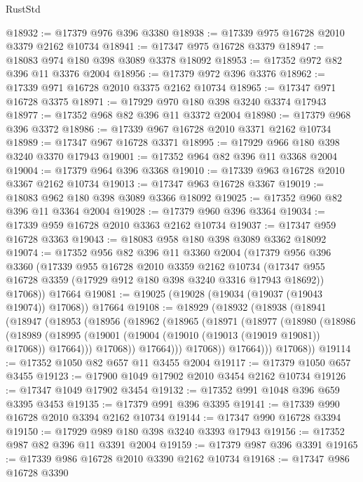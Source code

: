 \begin{lexlean}{RustStd}
\begin{coremodule}
@18932 := @17379 @976 @396 @3380
@18938 := @17339 @975 @16728 @2010 @3379 @2162 @10734
@18941 := @17347 @975 @16728 @3379
@18947 := @18083 @974 @180 @398 @3089 @3378 @18092
@18953 := @17352 @972 @82 @396 @11 @3376 @2004
@18956 := @17379 @972 @396 @3376
@18962 := @17339 @971 @16728 @2010 @3375 @2162 @10734
@18965 := @17347 @971 @16728 @3375
@18971 := @17929 @970 @180 @398 @3240 @3374 @17943
@18977 := @17352 @968 @82 @396 @11 @3372 @2004
@18980 := @17379 @968 @396 @3372
@18986 := @17339 @967 @16728 @2010 @3371 @2162 @10734
@18989 := @17347 @967 @16728 @3371
@18995 := @17929 @966 @180 @398 @3240 @3370 @17943
@19001 := @17352 @964 @82 @396 @11 @3368 @2004
@19004 := @17379 @964 @396 @3368
@19010 := @17339 @963 @16728 @2010 @3367 @2162 @10734
@19013 := @17347 @963 @16728 @3367
@19019 := @18083 @962 @180 @398 @3089 @3366 @18092
@19025 := @17352 @960 @82 @396 @11 @3364 @2004
@19028 := @17379 @960 @396 @3364
@19034 := @17339 @959 @16728 @2010 @3363 @2162 @10734
@19037 := @17347 @959 @16728 @3363
@19043 := @18083 @958 @180 @398 @3089 @3362 @18092
@19074 := @17352
    @956
    @82
    @396
    @11
    @3360
    @2004
    (@17379
      @956
      @396
      @3360
      (@17339
        @955
        @16728
        @2010
        @3359
        @2162
        @10734
        (@17347 @955 @16728 @3359 (@17929 @912 @180 @398 @3240 @3316 @17943 @18692))
        @17068))
    @17664
@19081 := @19025 (@19028 (@19034 (@19037 (@19043 @19074)) @17068)) @17664
@19108 := @18929
    (@18932
      (@18938
        (@18941
          (@18947
            (@18953
              (@18956
                (@18962
                  (@18965
                    (@18971
                      (@18977
                        (@18980
                          (@18986
                            (@18989
                              (@18995
                                (@19001 (@19004 (@19010 (@19013 (@19019 @19081)) @17068)) @17664)))
                            @17068))
                        @17664)))
                  @17068))
              @17664)))
        @17068))
@19114 := @17352 @1050 @82 @657 @11 @3455 @2004
@19117 := @17379 @1050 @657 @3455
@19123 := @17900 @1049 @17902 @2010 @3454 @2162 @10734
@19126 := @17347 @1049 @17902 @3454
@19132 := @17352 @991 @1048 @396 @659 @3395 @3453
@19135 := @17379 @991 @396 @3395
@19141 := @17339 @990 @16728 @2010 @3394 @2162 @10734
@19144 := @17347 @990 @16728 @3394
@19150 := @17929 @989 @180 @398 @3240 @3393 @17943
@19156 := @17352 @987 @82 @396 @11 @3391 @2004
@19159 := @17379 @987 @396 @3391
@19165 := @17339 @986 @16728 @2010 @3390 @2162 @10734
@19168 := @17347 @986 @16728 @3390

\end{coremodule}
\end{lexlean}
